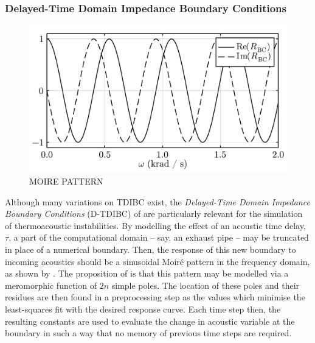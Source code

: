 \subsubsection{Delayed-Time Domain Impedance Boundary Conditions}




\begin{figure}[t]
\centering
\includegraphics[scale=0.35]{assets/graphs/complex_R_Moire.pdf}
\caption{MOIRE PATTERN}
\label{fig:moire}
\end{figure}

Although many variations on TDIBC exist, the \emph{Delayed-Time Domain Impedance Boundary Conditions} (D-TDIBC) of \cite{douasbin2018DelayedtimeDomainImpedance} are particularly relevant for the simulation of thermoacoustic instabilities. By modelling the effect of an acoustic time delay, $τ$, a part of the computational domain -- say, an exhaust pipe -- may be truncated in place of a numerical boundary. Then, the response of this new boundary to incoming acoustics should be a sinusoidal Moiré pattern in the frequency domain, as shown by . The proposition of \cite{douasbin2018DelayedtimeDomainImpedance} is that this pattern may be modelled via a meromorphic function of $2n$ simple poles. The location of these poles and their residues are then found in a preprocessing step as the values which minimise the least-squares fit with the desired response curve. Each time step then, the resulting constants are used to evaluate the change in acoustic variable at the boundary in such a way that no memory of previous time steps are required. 

